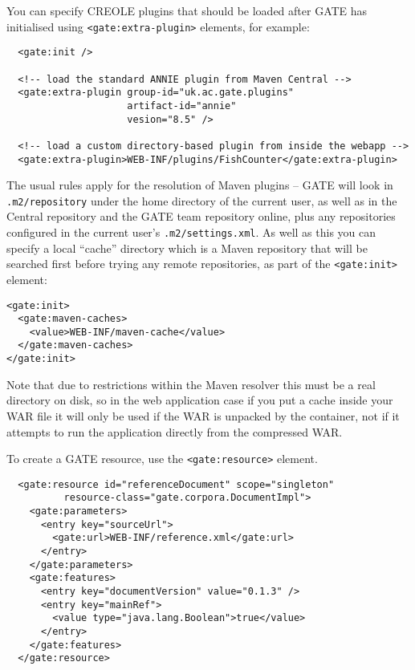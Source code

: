 You can specify CREOLE plugins that should be loaded after GATE has initialised
using \verb|<gate:extra-plugin>| elements, for example:
\begin{small}\begin{verbatim}
  <gate:init />

  <!-- load the standard ANNIE plugin from Maven Central -->
  <gate:extra-plugin group-id="uk.ac.gate.plugins"
                     artifact-id="annie"
                     vesion="8.5" />

  <!-- load a custom directory-based plugin from inside the webapp -->
  <gate:extra-plugin>WEB-INF/plugins/FishCounter</gate:extra-plugin>
\end{verbatim}\end{small}
%
The usual rules apply for the resolution of Maven plugins -- GATE will look in
\verb!.m2/repository! under the home directory of the current user, as well as
in the Central repository and the GATE team repository online, plus any
repositories configured in the current user's \verb!.m2/settings.xml!.  As well
as this you can specify a local ``cache'' directory which is a Maven repository
that will be searched first before trying any remote repositories, as part of
the \verb!<gate:init>! element:
\begin{small}\begin{verbatim}
<gate:init>
  <gate:maven-caches>
    <value>WEB-INF/maven-cache</value>
  </gate:maven-caches>
</gate:init>
\end{verbatim}\end{small}
%
Note that due to restrictions within the Maven resolver this must be a real
directory on disk, so in the web application case if you put a cache inside
your WAR file it will only be used if the WAR is unpacked by the container, not
if it attempts to run the application directly from the compressed WAR.

To create a GATE resource, use the \verb|<gate:resource>| element.
\begin{small}\begin{verbatim}
  <gate:resource id="referenceDocument" scope="singleton"
          resource-class="gate.corpora.DocumentImpl">
    <gate:parameters>
      <entry key="sourceUrl">
        <gate:url>WEB-INF/reference.xml</gate:url>
      </entry>
    </gate:parameters>
    <gate:features>
      <entry key="documentVersion" value="0.1.3" />
      <entry key="mainRef">
        <value type="java.lang.Boolean">true</value>
      </entry>
    </gate:features>
  </gate:resource>
\end{verbatim}\end{small}


